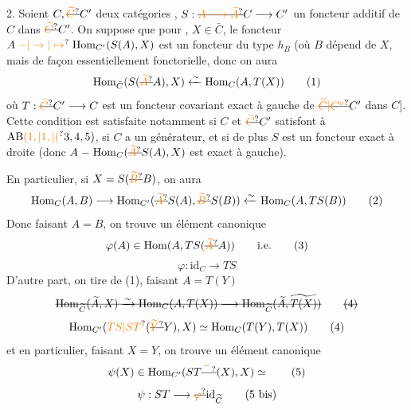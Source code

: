 2. Soient $C,\deleted{\unsure{\widetilde C}}C'$ deux catégories  , $S:\deleted{\unsure{A\longrightarrow\widetilde A}}C\longrightarrow C'$ un foncteur additif de $C$ dans $\deleted{\unsure{\widetilde C}}C'$. On suppose que pour  , $X\in\bar C$, le foncteur $A\mathrel{\unsure{-|\to|\mapsto}}\mathrm{Hom}_{C'}(S(A),X)$ est un foncteur du type  $h_B$ (où $B$ dépend de $X$, mais de façon essentiellement fonctorielle, donc on aura
\[
 \mathrm{Hom}_{\bar C}(S(\deleted{\unsure{\widetilde A}}A),X)\xleftarrow{\sim}\mathrm{Hom}_C(A,T(X)) \tag*{(1)}
\]
où $T:\deleted{\unsure{\widetilde C}}C'\longrightarrow C$ est un foncteur covariant exact à gauche de $\deleted{\unsure{\widetilde C|C^{o}}}C'$ dans $C$]. Cette condition est satisfaite notamment si $C$ et $\deleted{\unsure{\widetilde C}}C'$ satisfont à $\mathrm{AB}\unsure{(1,|1,|(}3,4,5)$, si $C$ a un générateur, et si de plus  $S$ est un foncteur exact à droite (donc $A\mathrel{-}\mathrm{Hom}_C(\deleted{\unsure{\widetilde A}}S(A),X)$ est exact à gauche). 

En particulier, si $X=S(\deleted{\unsure{\widetilde B}}B)$, on aura
\[
 \mathrm{Hom}_C(A,B)\longrightarrow\mathrm{Hom}_{C'}(\deleted{\unsure{\widetilde A}}S(A),\deleted{\unsure{\widetilde B}}S(B))\xleftarrow{\sim}\mathrm{Hom}_C(A,TS(B)) \tag*{(2)}
\]
Donc faisant $A=B$, on trouve un élément canonique
\[
 \varphi(A)\in\mathrm{Hom}(A,TS(\deleted{\unsure{\widetilde A}}A))\qquad\text{i.e.} \tag*{(3)}
\]
\[
 \varphi:\mathrm{id}_C\longrightarrow TS \tag*{(3 bis)}
\]
D'autre part, on tire de (1), faisant $A=T(Y)$
\[
 \deleted{\mathrm{Hom}_{\widetilde C}(\widetilde A,X)\xrightarrow{\sim}\mathrm{Hom}_C(A,T(X))\longrightarrow\mathrm{Hom}_{\widetilde C}(\widetilde A,\widetilde{T(X)})} \tag*{\deleted{(4)}}
\]
\[
 \mathrm{Hom}_{C'}(\unsure{TS|ST}(\deleted{\unsure{\widetilde Y}}Y),X)\simeq\mathrm{Hom}_C(T(Y),T(X)) \tag*{(4)}
\]
et en particulier, faisant  $X=Y$, on trouve un élément canonique
\[
 \psi(X)\in\mathrm{Hom}_{C'}(ST\deleted{\unsure{\widetilde{\phantom X}}}(X),X)\simeq \tag*{(5)}
\]
\[
 \psi:ST\longrightarrow\deleted{\unsure{\varphi}}\mathrm{id}_{\widetilde C} \tag*{(5 bis)}
\]

